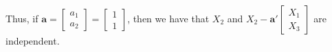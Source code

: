 \documentclass[12pt]{article}\usepackage[]{graphicx}\usepackage[]{color}
\newenvironment{problem}[2][Problem]{\begin{trivlist}
\item[\hskip \labelsep {\bfseries #1}\hskip \labelsep {\bfseries #2.}]}{\end{trivlist}}
\newcommand{\vct}{\mathbf}
\begin{document}
Thus, if $\vct{a} = \begin{bmatrix} a_1 \\ a_2 \end{bmatrix} = \begin{bmatrix} 1 \\ 1 \end{bmatrix}$, then we have that $X_2$ and $X_2 - \vct{a}'\begin{bmatrix} X_1 \\ X_3 \end{bmatrix}$ are independent.


\begin{problem}{4.5}
\end{problem}
\end{document}
